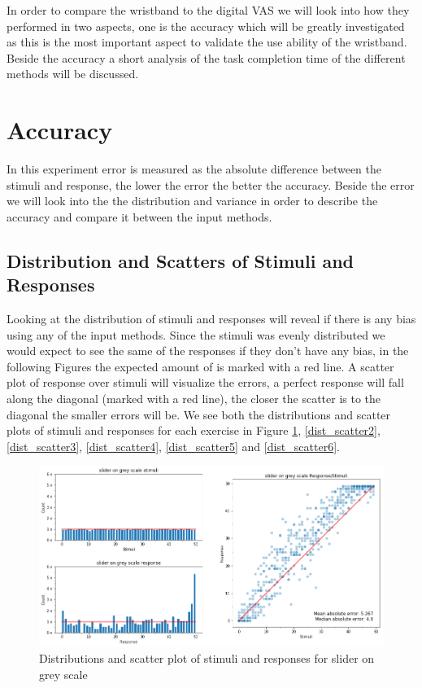 In order to compare the wristband to the digital VAS we will look into how they performed in two aspects, one is the accuracy which will be greatly investigated as this is the most important aspect to validate the use ability of the wristband. Beside the accuracy a short analysis of the task completion time of the different methods will be discussed.

\section{Accuracy}
In this experiment error is measured as the absolute difference between the stimuli and response, the lower the error the better the accuracy. Beside the error we will look into the the distribution and variance in order to describe the accuracy and compare it between the input methods. 


\subsection{Distribution and Scatters of Stimuli and Responses}
Looking at the distribution of stimuli and responses will reveal if there is any bias using any of the input methods. Since the stimuli was evenly distributed we would expect to see the same of the responses if they don't have any bias, in the following Figures the expected amount of is marked with a red line. A scatter plot of response over stimuli will visualize the errors, a perfect response will fall along the diagonal (marked with a red line), the closer the scatter is to the diagonal the smaller errors will be. We see both the distributions and scatter plots of stimuli and responses for each exercise in Figure \ref{dist_scatter1}, \ref{dist_scatter2}, \ref{dist_scatter3}, \ref{dist_scatter4}, \ref{dist_scatter5} and \ref{dist_scatter6}.


\begin{figure}[p]
    \centering
    \includegraphics[width=1.2\textwidth]{figures/dist_scatter1.png}
    \caption{Distributions and scatter plot of stimuli and responses for slider on grey scale}
    \label{dist_scatter1}
\end{figure}

